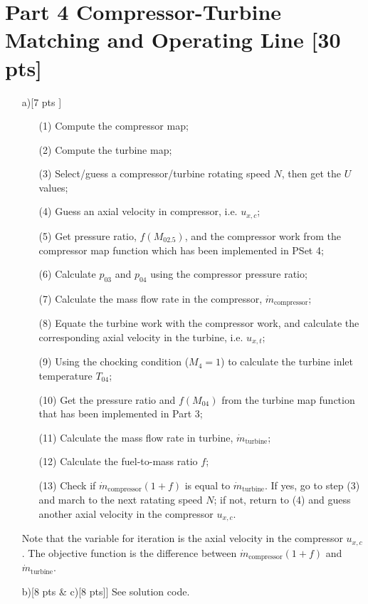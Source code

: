 \documentclass[12pt]{article}
\begin{document}
\section{Part 4 Compressor-Turbine Matching and Operating Line [30 pts]}		
\begin{itemize}
	\item[a)[7 pts]]
		\begin{itemize}
			\item[(1)] Compute the compressor map;
			\item[(2)] Compute the turbine map;
			\item[(3)] Select/guess a compressor/turbine rotating speed $N$, then get the $U$ values;
			\item[(4)] Guess an axial velocity in compressor, i.e. $u_{x,c}$;
			\item[(5)] Get pressure ratio, $f(M_{02.5})$, and the compressor work from the compressor map function which has been implemented in PSet 4;
			\item[(6)] Calculate $p_{03}$ and $p_{04}$ using the compressor pressure ratio;
			\item[(7)] Calculate the mass flow rate in the compressor, $\dot{m}_\text{compressor}$;
			\item[(8)] Equate the turbine work with the compressor work, and calculate the corresponding axial velocity in the turbine, i.e. $u_{x,t}$;
			\item[(9)] Using the chocking condition ($M_4 = 1$) to calculate the turbine inlet temperature $T_{04}$;
			\item[(10)] Get the pressure ratio and $f(M_{04})$ from the turbine map function that has been implemented in Part 3;
			\item[(11)] Calculate the mass flow rate in turbine, $\dot{m}_\text{turbine}$;
			\item[(12)] Calculate the fuel-to-mass ratio $f$;
			\item[(13)] Check if $\dot{m}_\text{compressor}(1+f)$ is equal to $\dot{m}_\text{turbine}$. If yes, go to step (3) and march to the next ratating speed $N$; if not, return to (4) and guess another axial velocity in the compressor $u_{x,c}$.
		\end{itemize}
		Note that the variable for iteration is the axial velocity in the compressor $u_{x,c}$. The objective function is the difference between $\dot{m}_\text{compressor}(1+f)$ and $\dot{m}_\text{turbine}$.
	\item[b)[8 pts] \& c)[8 pts]]
	See solution code.
		

\end{itemize}
\end{document}

